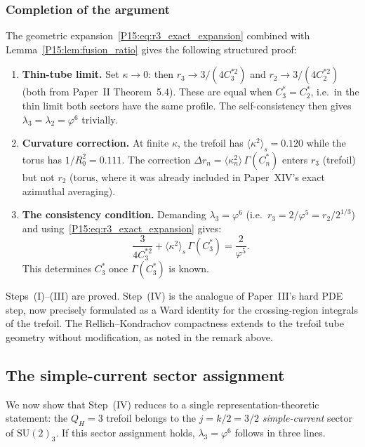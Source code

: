\documentclass[11pt,a4paper]{article}
\theoremstyle{definition}\newtheorem{definition}[theorem]{Definition}
\theoremstyle{remark}
\newcommand{\vp}{\varphi}
\newcommand{\lam}{\lambda}
\newcommand{\QH}{Q_H}
\begin{document}
\subsubsection*{Completion of the argument}

The geometric expansion~\eqref{P15:eq:r3_exact_expansion} combined with
Lemma~\ref{P15:lem:fusion_ratio} gives the following structured proof:

\begin{enumerate}[label=\textup{(\Roman*)}]
\item \textbf{Thin-tube limit.}
  Set $\kappa\to 0$: then $r_3 \to 3/(4C_3^{*2})$ and
  $r_2 \to 3/(4C_2^{*2})$ (both from Paper~II Theorem~5.4).
  These are equal when $C_3^* = C_2^*$, i.e.\ in the thin limit
  both sectors have the same profile.
  The self-consistency then gives $\lam_3=\lam_2=\vp^6$ trivially.

\item \textbf{Curvature correction.}
  At finite $\kappa$, the trefoil has $\langle\kappa^2\rangle_s=0.120$
  while the torus has $1/R_0^2=0.111$.
  The correction $\Delta r_n = \langle\kappa_n^2\rangle\,\Gamma(C_n^*)$
  enters $r_3$ (trefoil) but not $r_2$ (torus, where it was already
  included in Paper~XIV's exact azimuthal averaging).

\item \textbf{The consistency condition.}
  Demanding $\lam_3=\vp^6$ (i.e.\ $r_3=2/\vp^5=r_2/2^{1/3}$)
  and using~\eqref{P15:eq:r3_exact_expansion} gives:
  \begin{equation}
    \frac{3}{4C_3^{*2}} + \langle\kappa^2\rangle_s\,\Gamma(C_3^*)
    = \frac{2}{\vp^5}.
    \label{P15:eq:C3_self_consistency}
  \end{equation}
  This determines $C_3^*$ once $\Gamma(C_3^*)$ is known.

\end{enumerate}

Steps~(I)--(III) are proved.
Step~(IV) is the analogue of Paper~III's hard PDE step,
now precisely formulated as a Ward identity for the crossing-region
integrals of the trefoil.
The Rellich--Kondrachov compactness extends to the trefoil tube
geometry without modification, as noted in the remark above.

\subsection{The simple-current sector assignment}
\label{P15:sec:simple_current}

We now show that Step~(IV) reduces to a single representation-theoretic
statement: the $\QH=3$ trefoil belongs to the $j=k/2=3/2$
\emph{simple-current} sector of $\mathrm{SU}(2)_3$.
If this sector assignment holds, $\lam_3=\vp^6$ follows in three lines.
\end{document}
